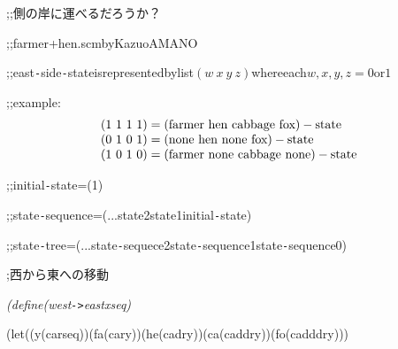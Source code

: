 \documentclass{article}
\begin{document}
\noindent
\mbox{};;\charwd 側の岸に運べるだろうか？

\noindent
\mbox{}\tt\mc \hfill

\noindent
\mbox{}\bf \sc %

\noindent
\mbox{};;\charwd farmer+hen.scm\charwd by\charwd Kazuo\charwd AMANO

\noindent
\mbox{};;\charwd east{\tt -}side{\tt -}state\charwd is\charwd represented\charwd by\charwd list\charwd $(w\ x\ y\ z)$\sc {}\charwd where\charwd each\charwd $w, x, y, z = 0$\sc {}\charwd or\charwd $1$\sc 

\noindent
\mbox{};;\charwd example:\charwd  \null\[
  \begin{array}{l}
 	(1\ 1\ 1\ 1) = {\rm (farmer\ hen\ cabbage\ fox)-state}\\
 	(0\ 1\ 0\ 1) = {\rm (none\ hen\ none\ fox)-state}\\
 	(1\ 0\ 1\ 0) = {\rm (farmer\ none\ cabbage\ none)-state}
  \end{array}
  \] \sc 

\noindent
\mbox{};;\charwd initial{\tt -}state\charwd =\charwd (1)

\noindent
\mbox{};;\charwd state{\tt -}sequence\charwd =\charwd (...\charwd state2\charwd state1\charwd initial{\tt -}state)

\noindent
\mbox{};;\charwd state{\tt -}tree\charwd =\charwd (...\charwd state{\tt -}sequece2\charwd state{\tt -}sequence1\charwd state{\tt -}sequence0)

\noindent
\mbox{}\tt\mc \hfill

\noindent
\mbox{}\sc \rm\mc %

\noindent
\mbox{};\charwd 西から東への移動

\noindent
\mbox{}\it (define{\it {}\charwd}(west{\tt -}{\tt >}east{\it {}\charwd}x{\it {}\charwd}seq)

\noindent
\mbox{}{\it {}\charwd}(let{\tt *}{\it {}\charwd}((y{\it {}\charwd}(car{\it {}\charwd}seq)){\it {}\charwd}(fa{\it {}\charwd}(car{\it {}\charwd}y)){\it {}\charwd}(he{\it {}\charwd}(cadr{\it {}\charwd}y)){\it {}\charwd}(ca{\it {}\charwd}(caddr{\it {}\charwd}y)){\it {}\charwd}(fo{\it {}\charwd}(cadddr{\it {}\charwd}y)))
\end{document}
